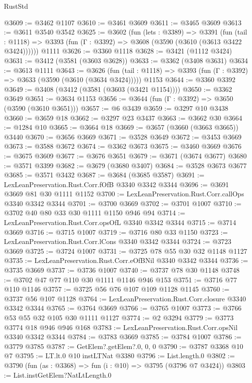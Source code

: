 \begin{lexlean}{RustStd}
\begin{coremodule}
@3609 := @3462 @1107
@3610 := @3461 @3609
@3611 := @3465 @3609
@3613 := @3611 @3540 @3542
@3625 := @3602
    (fun (lets : @3389) =>
    @3391
      (fun (tail : @1118) => @3393 (fun (Γ : @3392) => @3608 (@3590 (@3610 (@3613 @3422 @3424))))))
    @1111
@3626 := @3360 @1118
@3628 := @3421 (@1112 @3424)
@3631 := @3412 (@3581 (@3603 @3628))
@3633 := @3362 (@3408 @3631)
@3634 := @3613 @1111
@3643 := @3626
    (fun (tail : @1118) => @3393 (fun (Γ : @3392) => @3633 (@3590 (@3610 (@3634 @3424)))))
    @1153
@3644 := @3360 @3392
@3649 := @3408 (@3412 (@3581 (@3603 (@3421 @1154))))
@3650 := @3362 @3649
@3651 := @3634 @1153
@3656 := @3644 (fun (Γ : @3392) => @3650 (@3590 (@3610 @3651)))
@3657 := @6 @3439
@3659 := @3297 @10 @3438
@3660 := @3659 @18
@3662 := @3297 @23 @3437
@3663 := @3662 @30
@3664 := @1284 @10
@3665 := @3664 @18
@3669 := @3657 (@3660 (@3663 @3665)) @3440
@3670 := @3656 @3669
@3671 := @3528 @3649
@3672 := @3453 @3669
@3673 := @3588 @3672
@3674 := @3362 @3673
@3675 := @3460 @3669
@3676 := @3675 @3609
@3677 := @3676 @3651
@3679 := @3671 (@3674 @3677)
@3680 := @3571 @3399
@3682 := @3679 (@3680 @3407)
@3684 := @3528 @3673 @3677
@3685 := @3571 @3432
@3687 := @3684 (@3685 @3587)
@3691 := LexLeanPreservation.Rust.Corr.fOfB @3340 @3342 @3344
@3696 := @3691 @3669 @81 @30 @1111 @1152
@3700 := LexLeanPreservation.Rust.Corr.callOps @3340 @3342 @3344
@3701 := @3700 @3669
@3702 := @3701 @1007
@3710 := @3702 @40 @80 @33 @30 @1111 @1150 @946 @94
@3714 := LexLeanPreservation.Rust.Corr.opsOfL @3340 @3342 @3344
@3715 := @3714 @3669
@3716 := @3715 @1007
@3719 := @3716 @80 @33 @1150
@3723 := LexLeanPreservation.Rust.Corr.lCons @3340 @3342 @3344
@3724 := @3723 @3669
@3725 := @3724 @1007
@3731 := @3725 @78 @55 @30 @32 @1148 @1127
@3735 := LexLeanPreservation.Rust.Corr.eOfBNil @3340 @3342 @3344
@3736 := @3735 @3669
@3737 := @3736 @1007
@3740 := @3737 @78 @30 @1148
@3748 := @3702 @47 @77 @110 @30 @1111 @1146 @946 @153
@3751 := @3716 @77 @110 @1146
@3757 := @3725 @56 @76 @107 @109 @1128 @1145
@3760 := @3737 @56 @107 @1128
@3764 := LexLeanPreservation.Rust.Corr.closure @3340 @3342 @3344
@3765 := @3764 @3669
@3766 := @3765 @1007
@3773 := @3766 @53 @55 @32 @105 @30 @1111 @1127
@3774 := @2 @3294
@3779 := @3773 @3774 @18 @946 @946 @168
@3783 := LexLeanPreservation.Rust.Corr.opsNil @3340 @3342 @3344
@3784 := @3783 @3669
@3785 := @3784 @1007
@3786 := @3779 @3785
@3787 := GetElem?.getElem?.{0, 0, 0}
@3790 := @3787 @3368 @10 @7
@3795 := LT.lt.{0} @10 instLTNat @3380
@3796 := List.length.{0}
@3802 := @3790 (fun (as : @3368) => fun (i : @10) => @3795 (@3796 @7 @3424))
@3803 := List.instGetElem?NatLtLength.{0}

\end{coremodule}
\end{lexlean}
